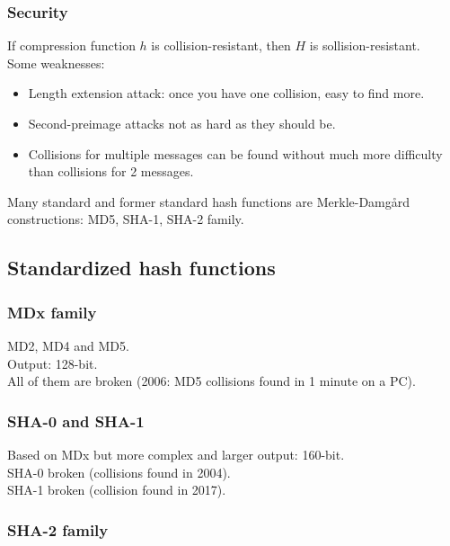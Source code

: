 \documentclass{article}
\begin{document}
\subsubsection{Security}

If compression function $h$ is collision-resistant, then $H$ is sollision-resistant.\\
Some weaknesses: 
\begin{itemize}
    \item Length extension attack: once you have one collision, easy to find more.
    \item Second-preimage attacks not as hard as they should be.
    \item Collisions for multiple messages can be found without much more difficulty than collisions for 2 messages.
\end{itemize}

Many standard and former standard hash functions are Merkle-Damgård constructions: MD5, SHA-1, SHA-2 family.

\subsection{Standardized hash functions}

\subsubsection{MDx family}

MD2, MD4 and MD5.\\
Output: 128-bit.\\
All of them are broken (2006: MD5 collisions found in 1 minute on a PC).

\subsubsection{SHA-0 and SHA-1}

Based on MDx but more complex and larger output: 160-bit.\\
SHA-0 broken (collisions found in 2004).\\
SHA-1 broken (collision found in 2017).

\subsubsection{SHA-2 family}
\end{document}
